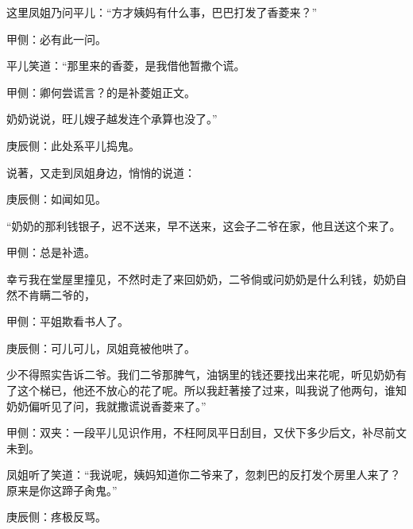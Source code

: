 \begin{parag}
    这里凤姐乃问平儿：“方才姨妈有什么事，巴巴打发了香菱来？”\begin{note}甲侧：必有此一问。\end{note}平儿笑道：“那里来的香菱，是我借他暂撒个谎。\begin{note}甲侧：卿何尝谎言？的是补菱姐正文。\end{note}奶奶说说，旺儿嫂子越发连个承算也没了。”\begin{note}庚辰侧：此处系平儿捣鬼。\end{note}说著，又走到凤姐身边，悄悄的说道：\begin{note}庚辰侧：如闻如见。\end{note}“奶奶的那利钱银子，迟不送来，早不送来，这会子二爷在家，他且送这个来了。\begin{note}甲侧：总是补遗。\end{note}幸亏我在堂屋里撞见，不然时走了来回奶奶，二爷倘或问奶奶是什么利钱，奶奶自然不肯瞒二爷的，\begin{note}甲侧：平姐欺看书人了。\end{note}\begin{note}庚辰侧：可儿可儿，凤姐竟被他哄了。\end{note}少不得照实告诉二爷。我们二爷那脾气，油锅里的钱还要找出来花呢，听见奶奶有了这个梯已，他还不放心的花了呢。所以我赶著接了过来，叫我说了他两句，谁知奶奶偏听见了问，我就撒谎说香菱来了。”\begin{note}甲侧：双夹：一段平儿见识作用，不枉阿凤平日刮目，又伏下多少后文，补尽前文未到。\end{note}凤姐听了笑道：“我说呢，姨妈知道你二爷来了，忽刺巴的反打发个房里人来了？原来是你这蹄子肏鬼。”\begin{note}庚辰侧：疼极反骂。\end{note}
\end{parag}


